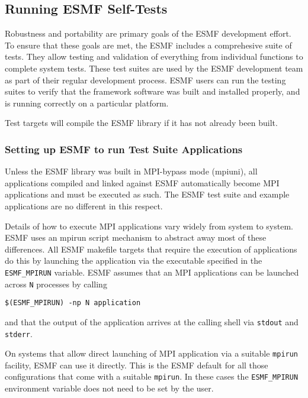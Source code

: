 
\subsection{Running ESMF Self-Tests}
\label{testing}

Robustness and portability are primary goals of the ESMF development
effort.  To ensure that these goals are met, the ESMF includes a
comprehesive suite of tests.  They allow testing and validation of
everything from individual functions to complete system tests.  These
test suites are used by the ESMF development team as part of their
regular development process.  ESMF users can run the testing suites to
verify that the framework software was built and installed properly,
and is running correctly on a particular platform.

Test targets will compile the ESMF library if it has not already been built.

\subsubsection{Setting up ESMF to run Test Suite Applications}
\label{ESMFRunSetting}

Unless the ESMF library was built in MPI-bypass mode (mpiuni), all applications
compiled and linked against ESMF automatically become MPI applications and must
be executed as such. The ESMF test suite and example applications are no
different in this respect.

Details of how to execute MPI applications vary widely from system to system.
ESMF uses an mpirun script mechanism to abstract away most of these differences.
All ESMF makefile targets that require the execution of applications do this by
launching the application via the executable specified in the 
{\tt ESMF\_MPIRUN} variable. ESMF assumes that an MPI applications can be 
launched across {\tt N} processes by calling

\begin{verbatim}
$(ESMF_MPIRUN) -np N application
\end{verbatim}

and that the output of the application arrives at the calling shell via 
{\tt stdout} and {\tt stderr}.

On systems that allow direct launching of MPI application via a suitable
{\tt mpirun} facility, ESMF can use it directly. This is the ESMF default for
all those configurations that come with a suitable {\tt mpirun}. In these
cases the {\tt ESMF\_MPIRUN} environment variable does not need to be set by
the user.

